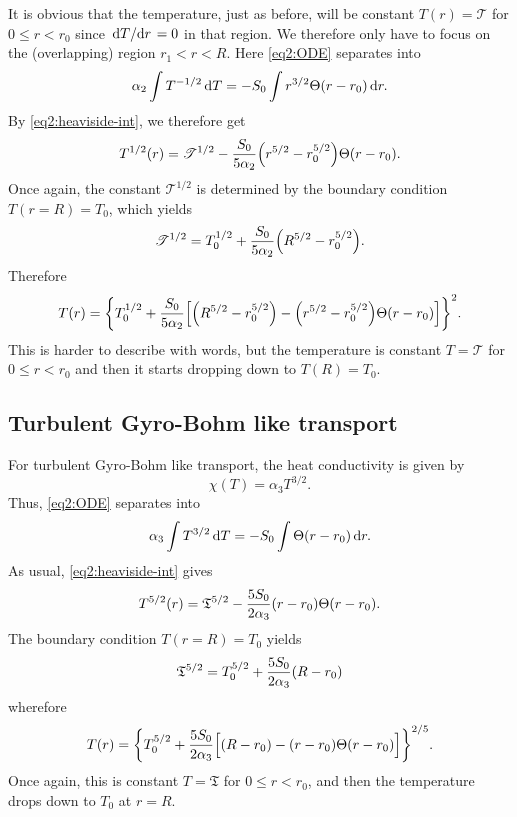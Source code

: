\documentclass[11pt,a4paper, 
swedish, english %
]{article}
\begin{document}
It is obvious that the temperature, just as before, will be constant
$T(r)=\mathscr{T}$ for $0\le r<r_0$ since $\dv*{T}{r}=0$ in that region. We
therefore only have to focus on the (overlapping) region
$r_1<r<R$. Here \eqref{eq2:ODE} 
separates into
\begin{equation}
\alpha_2\int T^{-1/2}\id{T}=-S_0\int r^{3/2}\Theta(r-r_0) \id{r}.
\end{equation}
By \eqref{eq2:heaviside-int}, we therefore get
\begin{equation}
T^{1/2}(r)=\mathscr{T}^{1/2}
-\frac{S_0}{5\alpha_2}\qty(r^{5/2}-r_0^{5/2})\Theta(r-r_0).
\end{equation}
Once again, the constant $\mathscr{T}^{1/2}$ is determined by the boundary
condition $T(r=R)=T_0$, which yields
\begin{equation}
\mathscr{T}^{1/2}=T_0^{1/2}+
\frac{S_0}{5\alpha_2}\qty(R^{5/2}-r_0^{5/2}).
\end{equation}
Therefore
\begin{equation}
T(r)=\qty{T_0^{1/2}+\frac{S_0}{5\alpha_2}
\qty[\qty(R^{5/2}-r_0^{5/2})-\qty(r^{5/2}-r_0^{5/2})\Theta(r-r_0)]}^2.
\end{equation}
This is harder to describe with words, but the temperature is constant
$T=\mathscr{T}$ for $0\le r<r_0$ and then it starts dropping down to
$T(R)=T_0$. 

\subsection{Turbulent Gyro-Bohm like transport}
For turbulent Gyro-Bohm like transport, the heat conductivity is given
by
\begin{equation}
\chi(T)=\alpha_3 T^{3/2}.
\end{equation}
Thus, \eqref{eq2:ODE} separates into
\begin{equation}
\alpha_3\int T^{3/2}\id{T}=-S_0\int \Theta(r-r_0) \id{r}.
\end{equation}
As usual, \eqref{eq2:heaviside-int} gives
\begin{equation}
T^{5/2}(r)=\mathfrak{T}^{5/2}
-\frac{5S_0}{2\alpha_3}\qty(r-r_0)\Theta(r-r_0).
\end{equation}
The boundary condition $T(r=R)=T_0$ yields
\begin{equation}
\mathfrak{T}^{5/2}=T_0^{5/2}+
\frac{5S_0}{2\alpha_3}\qty(R-r_0)
\end{equation}
wherefore
\begin{equation}
T(r)=\qty{T_0^{5/2}+\frac{5S_0}{2\alpha_3}
\Big[(R-r_0)-(r-r_0)\Theta(r-r_0)\Big]}^{2/5}.
\end{equation}
Once again, this is constant $T=\mathfrak{T}$ for $0\le r<r_0$, and
then the temperature drops down to $T_0$ at $r=R$.
\end{document}
